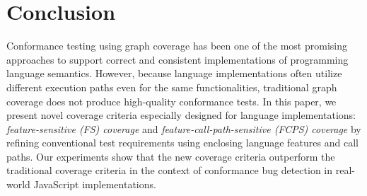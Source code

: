\documentclass[acmsmall,review,screen]{acmart}
\begin{document}
\section{Conclusion}\label{sec:conclusion}
Conformance testing using graph coverage has been one of the most
promising approaches to support correct and consistent implementations
of programming language semantics.
However, because language implementations often utilize 
different execution paths even for the same functionalities,
traditional graph coverage does not produce high-quality conformance tests.
In this paper, we present novel coverage criteria especially designed
for language implementations: \textit{feature-sensitive (FS) coverage} and
\textit{feature-call-path-sensitive (FCPS) coverage}
by refining conventional test requirements using
enclosing language features and call paths.
Our experiments show that the new coverage criteria outperform the
traditional coverage criteria in the context of conformance bug detection in
real-world JavaScript implementations.




\balance

\end{document}
